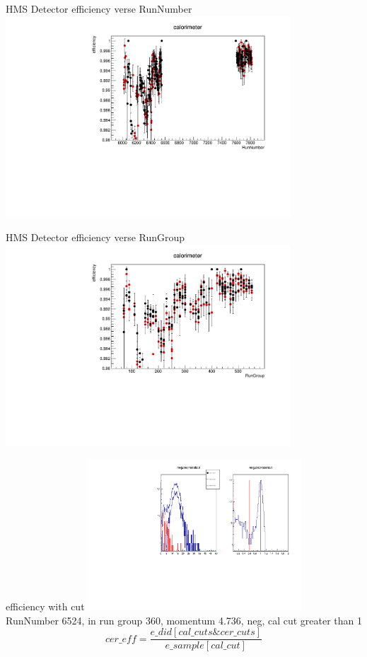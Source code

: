 \documentclass[aspectratio=169,xcolor=dvipsnames]{beamer}
\begin{document}
\begin{frame}{HMS Detector efficiency verse RunNumber}
  \includegraphics[width = 0.8\textwidth]{results/pid/HMS_cal_DE_RunNumber.pdf}
\end{frame}
\begin{frame}{HMS Detector efficiency verse RunGroup}
  \includegraphics[width = 0.8\textwidth]{results/pid/HMS_cal_DE_RunGroup.pdf}
\end{frame}
\begin{frame}{efficiency with cut}
  \includegraphics[width = 0.6\textwidth]{results/pid/cer_DE_6524.pdf}
  \\
  RunNumber 6524, in run group 360, momentum 4.736, neg, cal cut greater than 1
  \\
  $$cer\_eff = \frac{e\_did[cal\_cuts \& cer\_cuts]}{e\_sample[cal\_cut]}$$
\end{frame}
\end{document}
